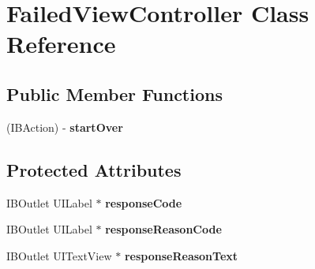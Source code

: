 \hypertarget{interface_failed_view_controller}{
\section{FailedViewController Class Reference}
\label{interface_failed_view_controller}
}
\subsection*{Public Member Functions}
\begin{DoxyCompactItemize}
\item 
\hypertarget{interface_failed_view_controller_a5287602165e6464d076984b1ccca249c}{
(IBAction) -\/ {\bfseries startOver}}
\label{interface_failed_view_controller_a5287602165e6464d076984b1ccca249c}

\end{DoxyCompactItemize}
\subsection*{Protected Attributes}
\begin{DoxyCompactItemize}
\item 
\hypertarget{interface_failed_view_controller_afe29df6bab9f9dbc807ebb4adb88af5c}{
IBOutlet UILabel $\ast$ {\bfseries responseCode}}
\label{interface_failed_view_controller_afe29df6bab9f9dbc807ebb4adb88af5c}

\item 
\hypertarget{interface_failed_view_controller_ae8f1e1d4eee9884a05659f7c173610c7}{
IBOutlet UILabel $\ast$ {\bfseries responseReasonCode}}
\label{interface_failed_view_controller_ae8f1e1d4eee9884a05659f7c173610c7}

\item 
\hypertarget{interface_failed_view_controller_aec0f3301f27791a8c272a03d57400305}{
IBOutlet UITextView $\ast$ {\bfseries responseReasonText}}
\label{interface_failed_view_controller_aec0f3301f27791a8c272a03d57400305}

\end{DoxyCompactItemize}
